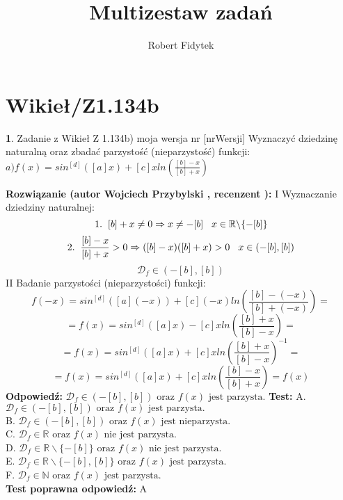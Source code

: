 \documentclass[12pt, a4paper]{article}
\title{Multizestaw zadań}
\author{Robert Fidytek}
\date{}
\theoremstyle{definition} %
\newtheorem{zad}{}
\newcommand{\kategoria}[1]{\section{#1}} %
\newcommand{\zadStart}[1]{\begin{zad}#1\newline} %
\newcommand{\zadStop}{\end{zad}}   %
\newcommand{\rozwStart}[2]{\noindent \textbf{Rozwiązanie (autor #1 , recenzent #2): }\newline} %
\newcommand{\rozwStop}{\newline}                                            %
\newcommand{\odpStart}{\noindent \textbf{Odpowiedź:}\newline}    %
\newcommand{\odpStop}{\newline}                                             %
\newcommand{\testStart}{\noindent \textbf{Test:}\newline} %
\newcommand{\testStop}{\newline} %
\newcommand{\kluczStart}{\noindent \textbf{Test poprawna odpowiedź:}\newline} %
\newcommand{\kluczStop}{\newline} %
\begin{document}
\maketitle


\kategoria{Wikieł/Z1.134b}
\zadStart{Zadanie z Wikieł Z 1.134b) moja wersja nr [nrWersji]}
Wyznaczyć dziedzinę naturalną oraz zbadać parzystość (nieparzystość) funkcji:\\
$a) f(x)=sin^{[d]}([a]x)+[c]xln(\frac{[b]-x}{[b]+x})$
\zadStop
\rozwStart{Wojciech Przybylski}{}
I Wyznaczanie dziedziny naturalnej:\\
$$1.\hspace{2mm} [b]+x\neq0 \Rightarrow x\neq-[b] \hspace{3mm} x\in\mathbb{R}\backslash\{-[b]\}$$
$$2.\hspace{2mm}\frac{[b]-x}{[b]+x}>0 \Rightarrow ([b]-x)([b]+x)>0\hspace{3mm} x\in (-[b],[b])$$
$$\mathcal{D}_{f}\in (-[b],[b])$$
II Badanie parzystości (nieparzystości) funkcji:
$$f(-x)=sin^{[d]}([a](-x))+[c](-x)ln(\frac{[b]-(-x)}{[b]+(-x)})=$$
$$=f(x)=sin^{[d]}([a]x)-[c]xln(\frac{[b]+x}{[b]-x})=$$
$$=f(x)=sin^{[d]}([a]x)+[c]xln(\frac{[b]+x}{[b]-x})^{-1}=$$
$$=f(x)=sin^{[d]}([a]x)+[c]xln(\frac{[b]-x}{[b]+x})=f(x)$$
\rozwStop
\odpStart
$\mathcal{D}_{f}\in (-[b],[b]) \mbox{ oraz } f(x)\mbox{ jest parzysta.}$ 
\odpStop
\testStart
A. $\mathcal{D}_{f}\in (-[b],[b]) \mbox{ oraz } f(x)\mbox{ jest parzysta.}$ \\
B. $\mathcal{D}_{f}\in (-[b],[b]) \mbox{ oraz } f(x)\mbox{ jest nieparzysta.}$ \\
C. $\mathcal{D}_{f}\in \mathbb{R} \mbox{ oraz } f(x)\mbox{ nie jest parzysta.}$ \\
D. $\mathcal{D}_{f}\in \mathbb{R}\backslash\{-[b]\} \mbox{ oraz } f(x)\mbox{ nie jest parzysta.}$ \\
E. $\mathcal{D}_{f}\in \mathbb{R}{\backslash}\{-[b],[b]\} \mbox{ oraz } f(x)\mbox{ jest parzysta.}$ \\
F. $\mathcal{D}_{f}\in \mathbb{N} \mbox{ oraz } f(x)\mbox{ jest parzysta.}$ \\
\testStop
\kluczStart
A
\kluczStop
\end{document}
